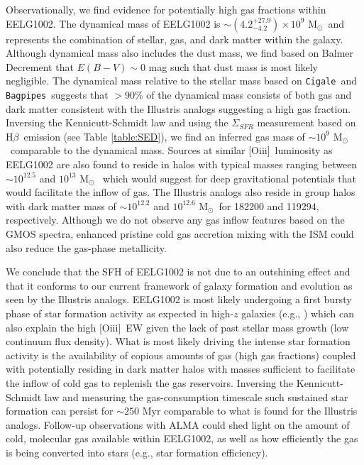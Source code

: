 \documentclass[twocolumn,tight,times,linenumbers]{aastex631}
\newcommand{\hbeta}{H$\beta$}
\newcommand{\oiii}{[O{\sc iii}]}
\newcommand{\msol}{M$_\odot$}
\newcommand{\cigale}{\texttt{Cigale}}
\newcommand{\bagpipes}{\texttt{Bagpipes}}
\begin{document}
		Observationally, we find evidence for potentially high gas fractions within EELG1002. The dynamical mass of EELG1002 is $\sim (4.2^{+27.9}_{-4.2}) \times 10^9$ \msol~and represents the combination of stellar, gas, and dark matter within the galaxy. Although dynamical mass also includes the dust mass, we find based on Balmer Decrement that $E(B - V) \sim 0$ mag such that dust mass is most likely negligible. The dynamical mass relative to the stellar mass based on \cigale~and \bagpipes~suggests that $> 90$\% of the dynamical mass consists of both gas and dark matter consistent with the Illustris analogs suggesting a high gas fraction. Inversing the Kennicutt-Schmidt law \citep{Kennicutt1998_KS} and using the $\Sigma_{SFR}$ measurement based on \hbeta~emission (see Table \ref{table:SED}), we find an inferred gas mass of $\sim 10^9$ \msol~comparable to the dynamical mass. Sources at similar \oiii~luminosity as EELG1002 are also found to reside in halos with typical masses ranging between $\sim 10^{12.5}$ and $10^{13}$ \msol~\citep{Khostovan2018} which would suggest for deep gravitational potentials that would facilitate the inflow of gas. The Illustris analogs also reside in group halos with dark matter mass of $\sim 10^{12.2}$ and $10^{12.6}$ \msol~for 182200 and 119294, respectively. Although we do not observe any gas inflow features based on the GMOS spectra, enhanced pristine cold gas accretion mixing with the ISM could also reduce the gas-phase metallicity. 
		
		We conclude that the SFH of EELG1002 is not due to an outshining effect and that it conforms to our current framework of galaxy formation and evolution as seen by the Illustris analogs. EELG1002 is most likely undergoing a first bursty phase of star formation activity as expected in high-$z$ galaxies (e.g., \citealt{Cohn2018}) which can also explain the high \oiii~EW given the lack of past stellar mass growth (low continuum flux density). What is most likely driving the intense star formation activity is the availability of copious amounts of gas (high gas fractions) coupled with potentially residing in dark matter halos with masses sufficient to facilitate the inflow of cold gas to replenish the gas reservoirs. Inversing the Kennicutt-Schmidt law \citep{Kennicutt1998_KS} and measuring the gas-consumption timescale such sustained star formation can persist for $\sim 250$ Myr comparable to what is found for the Illustris analogs. Follow-up observations with ALMA could shed light on the amount of cold, molecular gas available within EELG1002, as well as how efficiently the gas is being converted into stars (e.g., star formation efficiency).
		
\end{document}
